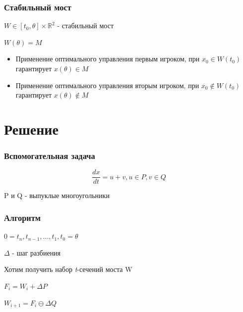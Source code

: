 \documentclass{beamer}
\newcommand{\dimension}{\mathbb{R}^2}
\begin{document}
  
  \begin{frame}
    \frametitle{Стабильный мост}

    $W \in [t_0, \theta] \times \dimension$ - стабильный мост

    $W(\theta)=M$

    \begin{itemize}
      \item Применение оптимального управления первым игроком,
      при $x_0 \in W(t_0)$ гарантирует $x(\theta) \in M$
      \item Применение оптимального управления вторым игроком,
      при $x_0 \notin W(t_0)$ гарантирует $x(\theta) \notin M$
    \end{itemize}

  \end{frame}
  
  
  \section{Решение}
  
  
  \begin{frame}
    \frametitle{Вспомогательная задача}

    \begin{equation}
      \frac{dx}{dt} = u + v, u \in P, v \in Q
    \end{equation}

    P и Q - выпуклые многоугольники

  \end{frame}
  
  
  \begin{frame}
    \frametitle{Алгоритм}

    $0=t_n, t_{n-1}, ..., t_1, t_0=\theta$

    $\Delta$ - шаг разбиения 

    Хотим получить набор \textit{t}-сечений моста W

    $F_i = W_i + \Delta P$
    
    $W_{i+1} = F_i \ominus \Delta  Q$

  \end{frame}
  
\end{document}
